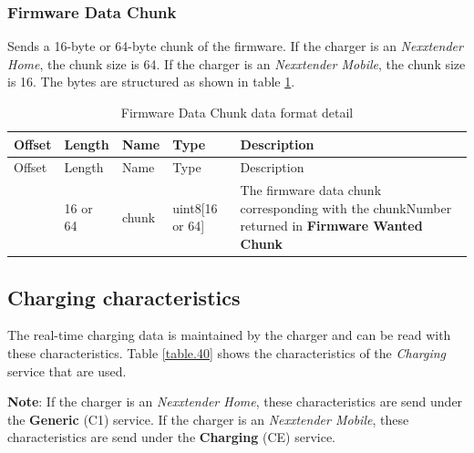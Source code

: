 \documentclass[a4paper]{article}
\begin{document}
\subsubsection{Firmware Data Chunk}
\label{firmware_data_chunk}

Sends a 16-byte or 64-byte chunk of the firmware. 
If the charger is an \emph{Nexxtender Home}, the chunk size is 64. 
If the charger is an \emph{Nexxtender Mobile}, the chunk size is 16.
The bytes are structured as shown in table \ref{table.73}.

\begin{longtable}[]{@{}llllp{10cm}@{}}
	\caption{Firmware Data Chunk data format detail}
	\label{table.73}
	\tabularnewline
	\toprule\noalign{}
	Offset & Length   & Name  & Type                & Description             \\
	\midrule\noalign{}
	\endfirsthead
	\toprule\noalign{}
	Offset & Length   & Name  & Type                & Description             \\
	\midrule\noalign{}
	\endhead
	\bottomrule\noalign{}
	\endlastfoot
	0      & 16 or 64 & chunk & uint8{[}16 or 64{]} & The firmware data chunk corresponding 
	with the chunkNumber returned in \textbf{Firmware Wanted Chunk} \\
\end{longtable}

\subsection{Charging characteristics}
\label{charging_characteristics}

The real-time charging data is maintained by the charger and can be read with these characteristics.
Table \ref{table.40} shows the characteristics of the \emph{Charging} service that are used.

\textbf{Note}: If the charger is an \emph{Nexxtender Home}, 
these characteristics are send under the \textbf{Generic} (C1) service. 
If the charger is an \emph{Nexxtender Mobile}, these characteristics are send
under the \textbf{Charging} (CE) service.
\end{document}
